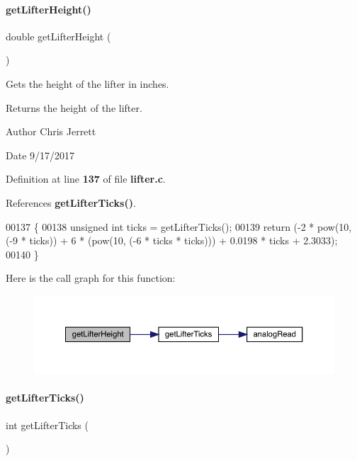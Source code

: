\paragraph{get\+Lifter\+Height()}
{\footnotesize\ttfamily double get\+Lifter\+Height (\begin{DoxyParamCaption}{ }\end{DoxyParamCaption})}



Gets the height of the lifter in inches. 

\begin{DoxyReturn}{Returns}
the height of the lifter. 
\end{DoxyReturn}
\begin{DoxyAuthor}{Author}
Chris Jerrett 
\end{DoxyAuthor}
\begin{DoxyDate}{Date}
9/17/2017 
\end{DoxyDate}


Definition at line \textbf{ 137} of file \textbf{ lifter.\+c}.



References \textbf{ get\+Lifter\+Ticks()}.


\begin{DoxyCode}
00137                          \{
00138   \textcolor{keywordtype}{unsigned} \textcolor{keywordtype}{int} ticks = getLifterTicks();
00139   \textcolor{keywordflow}{return} (-2 * pow(10, (-9 * ticks)) + 6 * (pow(10, (-6 * ticks * ticks))) + 0.0198 * ticks + 2.3033);
00140 \}
\end{DoxyCode}
Here is the call graph for this function\+:\nopagebreak
\begin{figure}[H]
\begin{center}
\leavevmode
\includegraphics[width=350pt]{lifter_8c_a2719740958fd8a5926f88f6194e820e3_cgraph}
\end{center}
\end{figure}
\mbox{\label{lifter_8c_acdf909159b0406c48099843f2306be78}} 
\paragraph{get\+Lifter\+Ticks()}
{\footnotesize\ttfamily int get\+Lifter\+Ticks (\begin{DoxyParamCaption}{ }\end{DoxyParamCaption})}



